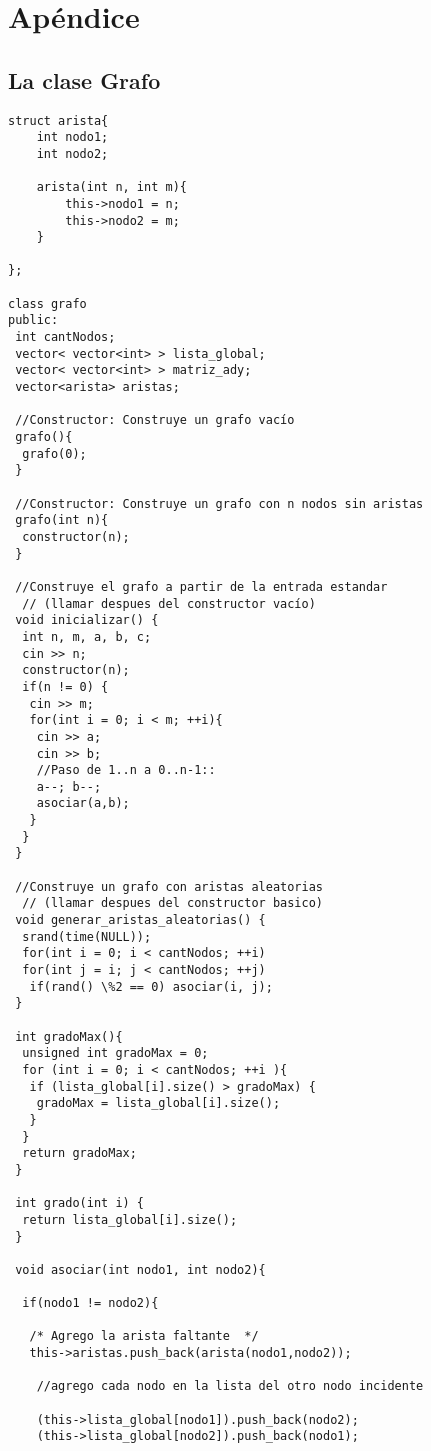 \section{Apéndice}

\subsection {La clase Grafo}
\begin{lstlisting}
struct arista{
	int nodo1;
	int nodo2;
	
	arista(int n, int m){
		this->nodo1 = n;
		this->nodo2 = m;
	}

};

class grafo
public:
 int cantNodos;
 vector< vector<int> > lista_global;
 vector< vector<int> > matriz_ady;
 vector<arista> aristas;

 //Constructor: Construye un grafo vacío
 grafo(){
  grafo(0);
 }

 //Constructor: Construye un grafo con n nodos sin aristas
 grafo(int n){
  constructor(n);
 }

 //Construye el grafo a partir de la entrada estandar
  // (llamar despues del constructor vacío)
 void inicializar() {
  int n, m, a, b, c;
  cin >> n;
  constructor(n);
  if(n != 0) {
   cin >> m;
   for(int i = 0; i < m; ++i){
    cin >> a;
    cin >> b;
    //Paso de 1..n a 0..n-1::
    a--; b--;
    asociar(a,b);
   }
  }
 }

 //Construye un grafo con aristas aleatorias
  // (llamar despues del constructor basico)
 void generar_aristas_aleatorias() {
  srand(time(NULL));
  for(int i = 0; i < cantNodos; ++i)
  for(int j = i; j < cantNodos; ++j)
   if(rand() \%2 == 0) asociar(i, j);
 }

 int gradoMax(){
  unsigned int gradoMax = 0;
  for (int i = 0; i < cantNodos; ++i ){
   if (lista_global[i].size() > gradoMax) {
    gradoMax = lista_global[i].size();
   }
  }
  return gradoMax;
 }

 int grado(int i) {
  return lista_global[i].size();
 }

 void asociar(int nodo1, int nodo2){

  if(nodo1 != nodo2){

   /* Agrego la arista faltante  */
   this->aristas.push_back(arista(nodo1,nodo2));
   
    //agrego cada nodo en la lista del otro nodo incidente
     
    (this->lista_global[nodo1]).push_back(nodo2);
    (this->lista_global[nodo2]).push_back(nodo1);
  

\end{lstlisting}
